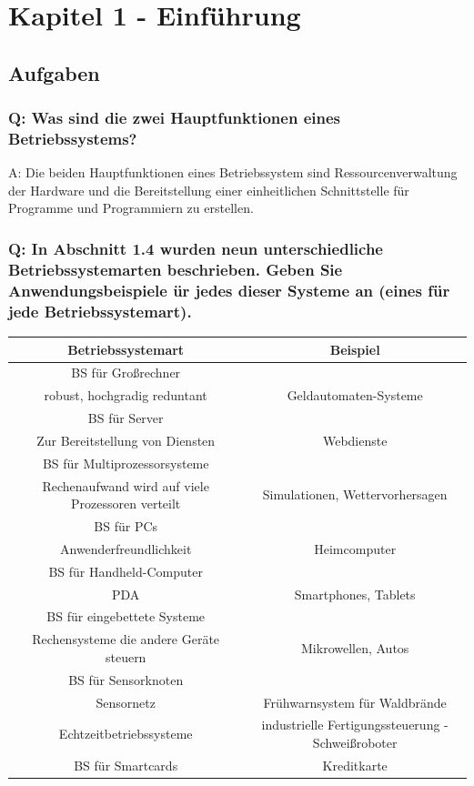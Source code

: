 \documentclass[12pt,a4paper]{univention}
\author{Julia Bremer}
\begin{document}
\tableofcontents
\newpage
\section{Kapitel 1 - Einführung}
\subsection{Aufgaben}
\subsubsection{Q: Was sind die zwei Hauptfunktionen eines Betriebssystems?}
A: Die beiden Hauptfunktionen eines Betriebssystem sind Ressourcenverwaltung der Hardware und die Bereitstellung einer einheitlichen Schnittstelle für Programme und Programmiern zu erstellen.
\subsubsection{Q: In Abschnitt 1.4 wurden neun unterschiedliche Betriebssystemarten beschrieben. Geben Sie Anwendungsbeispiele ür jedes dieser Systeme an (eines für jede Betriebssystemart).}
\begin{tabular}{|c|c|}
\hline 
Betriebssystemart & Beispiel \\ 
\hline 
BS für Großrechner\\robust, hochgradig reduntant & Geldautomaten-Systeme \\ 
\hline 
BS für Server\\Zur Bereitstellung von Diensten & Webdienste \\ 
\hline 
BS für Multiprozessorsysteme\\Rechenaufwand wird auf viele Prozessoren verteilt & Simulationen, Wettervorhersagen \\ 
\hline 
BS für PCs\\Anwenderfreundlichkeit & Heimcomputer \\ 
\hline 
BS für Handheld-Computer\\PDA & Smartphones, Tablets \\ 
\hline 
BS für eingebettete Systeme\\Rechensysteme die andere Geräte steuern & Mikrowellen, Autos \\ 
\hline 
BS für Sensorknoten\\Sensornetz & Frühwarnsystem für Waldbrände \\ 
\hline 
Echtzeitbetriebssysteme & industrielle Fertigungssteuerung - Schweißroboter \\ 
\hline 
BS für Smartcards & Kreditkarte \\ 
\hline 
\end{tabular} 
\end{document}
